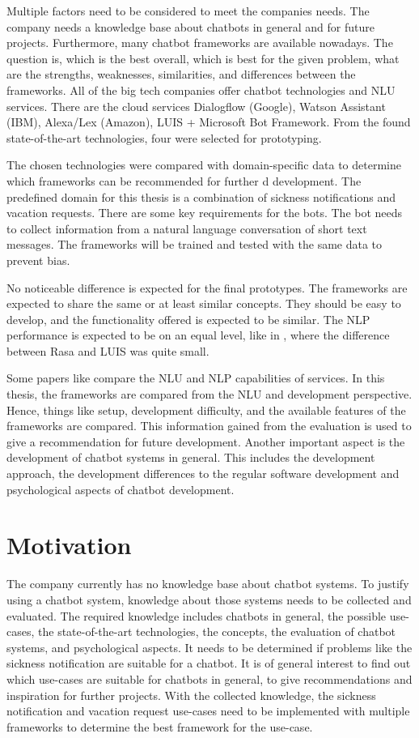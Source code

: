 Multiple factors need to be considered to meet the companies needs.
The company needs a knowledge base about chatbots in general and for future projects. 
Furthermore, many chatbot frameworks are available nowadays.
The question is, which is the best overall, which is best for the given problem, what are the strengths, weaknesses, similarities, and differences between the frameworks.
All of the big tech companies offer chatbot technologies and NLU services.
There are the cloud services Dialogflow (Google), Watson Assistant (IBM), Alexa/Lex (Amazon), LUIS + Microsoft Bot Framework.
From the found state-of-the-art technologies, four were selected for prototyping.

The chosen technologies were compared with domain-specific data to determine which frameworks can be recommended for further d
development.
The predefined domain for this thesis is a combination of sickness notifications and vacation requests.
There are some key requirements for the bots.
The bot needs to collect information from a natural language conversation of short text messages.
The frameworks will be trained and tested with the same data to prevent bias.

No noticeable difference is expected for the final prototypes.
The frameworks are expected to share the same or at least similar concepts.
They should be easy to develop, and the functionality offered is expected to be similar.
The NLP performance is expected to be on an equal level, like in \citet{braunEvaluatingNLU}, where the difference between Rasa and LUIS was quite small.

Some papers like \citet{braunEvaluatingNLU} compare the NLU and NLP capabilities of services.
In this thesis, the frameworks are compared from the NLU and development perspective.
Hence, things like setup, development difficulty, and 
the available features of the frameworks are compared.
This information gained from the evaluation is used to give a recommendation for future development.
Another important aspect is the development of chatbot systems in general.
This includes the development approach, the development differences to 
the regular software development and psychological aspects of chatbot development.


\section{Motivation} %
The company currently has no knowledge base about chatbot systems.
To justify using a chatbot system, knowledge about those systems needs to be collected and evaluated.
The required knowledge includes chatbots in general, the possible use-cases, the state-of-the-art technologies, the concepts, 
the evaluation of chatbot systems, and psychological aspects.
It needs to be determined if problems like the sickness notification are suitable for a chatbot.
It is of general interest to find out which use-cases are suitable for chatbots in general, to give recommendations and inspiration for further projects.
With the collected knowledge, the sickness notification and vacation request use-cases need to be implemented with multiple frameworks to determine the best framework for the use-case.

